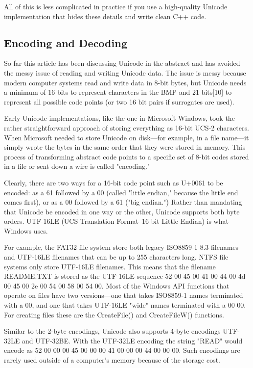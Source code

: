 All of this is less complicated in practice if you use a high-quality
Unicode implementation that hides these details and write clean C++
code. 


\subsection{Encoding and Decoding}

So far this article has been discussing Unicode in the abstract and has avoided the messy issue of reading and writing Unicode data. The issue is messy because modern computer systems read and write data in 8-bit bytes, but Unicode needs a minimum of 16 bits to represent characters in the BMP and 21 bits[10] to represent all possible code points (or two 16 bit pairs if surrogates are used).

Early Unicode implementations, like the one in Microsoft Windows, took the rather straightforward approach of storing everything as 16-bit UCS-2 characters. When Microsoft needed to store Unicode on disk---for example, in a file name---it simply wrote the bytes in the same order that they were stored in memory. This process of transforming abstract code points to a specific set of 8-bit codes stored in a file or sent down a wire is called "encoding."

Clearly, there are two ways for a 16-bit code point such as U+0061 to be encoded: as a 61 followed by a 00 (called "little endian," because the little end comes first), or as a 00 followed by a 61 ("big endian.") Rather than mandating that Unicode be encoded in one way or the other, Unicode supports both byte orders. UTF-16LE (UCS Translation Format--16 bit Little Endian) is what Windows uses.

For example, the FAT32 file system store both legacy ISO8859-1 8.3 filenames and UTF-16LE filenames that can be up to 255 characters long. NTFS file systems only store UTF-16LE filenames. This means that the filename README.TXT is stored as the UTF-16LE sequence 52 00 45 00 41 00 44 00 4d 00 45 00 2e 00 54 00 58 00 54 00. Most of the Windows API functions that operate on files have two versions---one that takes ISO8859-1 names terminated with a 00, and one that takes UTF-16LE "wide" names terminated with a 00 00. For creating files these are the CreateFile() and CreateFileW() functions. 

Similar to the 2-byte encodings, Unicode also supports 4-byte encodings UTF-32LE and UTF-32BE. With the UTF-32LE encoding the string "READ" would encode as 52 00 00 00 45 00 00 00 41 00 00 00 44 00 00 00. Such encodings are rarely used outside of a computer's memory because of the storage cost.

